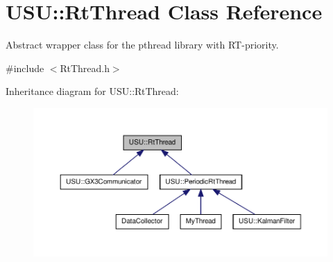 \hypertarget{class_u_s_u_1_1_rt_thread}{\section{\-U\-S\-U\-:\-:\-Rt\-Thread \-Class \-Reference}
\label{class_u_s_u_1_1_rt_thread}
}


\-Abstract wrapper class for the pthread library with \-R\-T-\/priority.  




{\ttfamily \#include $<$\-Rt\-Thread.\-h$>$}



\-Inheritance diagram for \-U\-S\-U\-:\-:\-Rt\-Thread\-:
\nopagebreak
\begin{figure}[H]
\begin{center}
\leavevmode
\includegraphics[width=350pt]{class_u_s_u_1_1_rt_thread__inherit__graph}
\end{center}
\end{figure}
